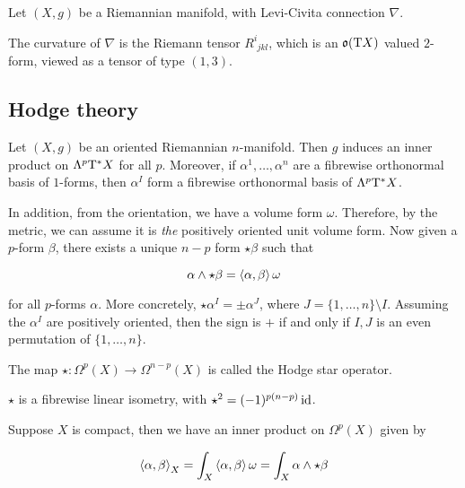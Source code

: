 Let \((X, g)\) be a Riemannian manifold, with Levi-Civita connection \(\nabla\).

\begin{definition}
     The curvature of \(\nabla\) is the Riemann tensor \(R^{i}_{\phantom ijkl}\), which is an \(\mathfrak{o}(\mathrm{T} X)\) valued \(2\)-form, viewed as a tensor of type \((1, 3)\).
\end{definition}

\subsection{Hodge theory}

Let \((X, g)\) be an oriented Riemannian \(n\)-manifold. Then \(g\) induces an inner product on \(\Lambda^p\mathrm{T}^*X\) for all \(p\). Moreover, if \(\alpha^1, \dots, \alpha^n\) are a fibrewise orthonormal basis of \(1\)-forms, then \(\alpha^I\) form a fibrewise orthonormal basis of \(\Lambda^p\mathrm{T}^*X\).

In addition, from the orientation, we have a volume form \(\omega\). Therefore, by the metric, we can assume it is \emph{the} positively oriented unit volume form. Now given a \(p\)-form \(\beta\), there exists a unique \(n - p\) form \(\star\beta\) such that

\[\alpha \wedge \star\beta = \left\langle \alpha, \beta \right\rangle\omega\]

for all \(p\)-forms \(\alpha\). More concretely, \(\star\alpha^I = \pm\alpha^J\), where \(J = \{1, \dots, n\} \setminus I\). Assuming the \(\alpha^I\) are positively oriented, then the sign is \(+\) if and only if \(I, J\) is an even permutation of \(\{1, \dots, n\}\).

\begin{definition}
     The map \(\star : \Omega^p(X) \to \Omega^{n-p}(X)\) is called the Hodge star operator.\
\end{definition}

\begin{proposition}
    \(\star\) is a fibrewise linear isometry, with \(\star^2 = (-1)^{p(n-p)}\operatorname{id}\).
\end{proposition}

\begin{definition}
     Suppose \(X\) is compact, then we have an inner product on \(\Omega^p(X)\) given by

    \[\left\langle \alpha, \beta \right\rangle_X = \int_X\left\langle \alpha,\beta \right\rangle\omega = \int_X \alpha\wedge \star\beta\]
\end{definition}

